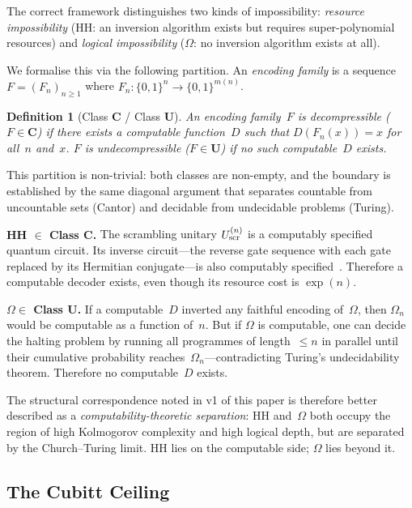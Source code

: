 \documentclass[12pt,a4paper]{article}
\newtheorem{definition}[theorem]{Definition}
\theoremstyle{remark}
\begin{document}
The correct framework distinguishes two kinds of impossibility:
\emph{resource impossibility} (HH: an inversion algorithm exists but requires super-polynomial resources) and \emph{logical impossibility} ($\Omega$: no inversion algorithm exists at all).

We formalise this via the following partition.
An \emph{encoding family} is a sequence $F = (F_n)_{n\ge 1}$ where $F_n : \{0,1\}^n \to \{0,1\}^{m(n)}$.

\begin{definition}[Class $\mathbf{C}$ / Class $\mathbf{U}$]\label{def:CU}
An encoding family~$F$ is \emph{decompressible} ($F \in \mathbf{C}$) if there exists a computable function~$D$ such that $D(F_n(x)) = x$ for all~$n$ and~$x$.
$F$ is \emph{undecompressible} ($F \in \mathbf{U}$) if no such computable~$D$ exists.
\end{definition}

This partition is non-trivial: both classes are non-empty, and the boundary is established by the same diagonal argument that separates countable from uncountable sets (Cantor) and decidable from undecidable problems (Turing).

\medskip\noindent\textbf{HH $\in$ Class $\mathbf{C}$.}
The scrambling unitary $U_{\rm scr}^{(n)}$ is a computably specified quantum circuit.
Its inverse circuit---the reverse gate sequence with each gate replaced by its Hermitian conjugate---is also computably specified~\cite{ChengPaperC2026}.
Therefore a computable decoder exists, even though its resource cost is $\exp(n)$.

\medskip\noindent\textbf{$\Omega \in$ Class $\mathbf{U}$.}
If a computable~$D$ inverted any faithful encoding of~$\Omega$, then $\Omega_n$ would be computable as a function of~$n$.
But if $\Omega$ is computable, one can decide the halting problem by running all programmes of length~$\le n$ in parallel until their cumulative probability reaches~$\Omega_n$---contradicting Turing's undecidability theorem.
Therefore no computable~$D$ exists.

\medskip
The structural correspondence noted in v1 of this paper is therefore better described as a \emph{computability-theoretic separation}: HH and~$\Omega$ both occupy the region of high Kolmogorov complexity and high logical depth, but are separated by the Church--Turing limit.
HH lies on the computable side; $\Omega$ lies beyond it.

\subsection{The Cubitt Ceiling}
\end{document}
